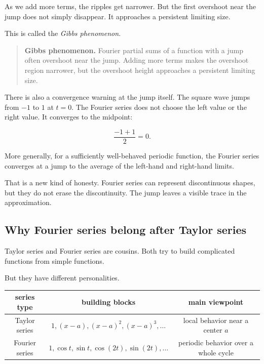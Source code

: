 As we add more terms, the ripples get narrower.  But the first overshoot near the jump
does not simply disappear.  It approaches a persistent limiting size.

This is called the \emph{Gibbs phenomenon}.

\begin{quote}
\textbf{Gibbs phenomenon.}
Fourier partial sums of a function with a jump often overshoot near the jump.  Adding
more terms makes the overshoot region narrower, but the overshoot height approaches
a persistent limiting size.
\end{quote}

There is also a convergence warning at the jump itself.  The square wave jumps from
\(-1\) to \(1\) at \(t=0\).  The Fourier series does not choose the left value or the right
value.  It converges to the midpoint:

\[
\frac{-1+1}{2}=0.
\]

More generally, for a sufficiently well-behaved periodic function, the Fourier series
converges at a jump to the average of the left-hand and right-hand limits.

That is a new kind of honesty.  Fourier series can represent discontinuous shapes, but
they do not erase the discontinuity.  The jump leaves a visible trace in the approximation.

\subsection{Why Fourier series belong after Taylor series}
\label{subsec:why-fourier-after-taylor}

Taylor series and Fourier series are cousins.  Both try to build complicated functions
from simple functions.

But they have different personalities.

\begin{center}
\renewcommand{\arraystretch}{1.35}
\begin{tabular}{c|c|c}
\textbf{series type} & \textbf{building blocks} & \textbf{main viewpoint} \\ \hline
Taylor series &
\(1,(x-a),(x-a)^2,(x-a)^3,\ldots\) &
local behavior near a center \(a\) \\

Fourier series &
\(1,\cos t,\sin t,\cos(2t),\sin(2t),\ldots\) &
periodic behavior over a whole cycle
\end{tabular}
\end{center}

